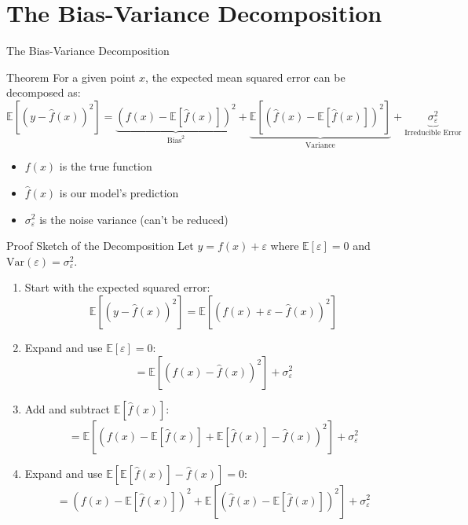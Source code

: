 \documentclass{beamer}
\begin{document}
\section{The Bias-Variance Decomposition}

\begin{frame}{The Bias-Variance Decomposition}
  \begin{block}{Theorem}
    For a given point $x$, the expected mean squared error can be decomposed as:
    \[
    \mathbb{E}[(y - \hat{f}(x))^2] = \underbrace{(f(x) - \mathbb{E}[\hat{f}(x)])^2}_{\text{Bias}^2} + \underbrace{\mathbb{E}[(\hat{f}(x) - \mathbb{E}[\hat{f}(x)])^2]}_{\text{Variance}} + \underbrace{\sigma^2_\varepsilon}_{\text{Irreducible Error}}
    \]
  \end{block}

  \begin{itemize}
    \item $f(x)$ is the true function
    \item $\hat{f}(x)$ is our model's prediction
    \item $\sigma^2_\varepsilon$ is the noise variance (can't be reduced)
  \end{itemize}
\end{frame}

\begin{frame}{Proof Sketch of the Decomposition}
  Let $y = f(x) + \varepsilon$ where $\mathbb{E}[\varepsilon] = 0$ and $\text{Var}(\varepsilon) = \sigma^2_\varepsilon$.
  
  \begin{enumerate}
    \item Start with the expected squared error:
    \[
    \mathbb{E}[(y - \hat{f}(x))^2] = \mathbb{E}[(f(x) + \varepsilon - \hat{f}(x))^2]
    \]
    
    \item Expand and use $\mathbb{E}[\varepsilon] = 0$:
    \[
    = \mathbb{E}[(f(x) - \hat{f}(x))^2] + \sigma^2_\varepsilon
    \]
    
    \item Add and subtract $\mathbb{E}[\hat{f}(x)]$:
    \[
    = \mathbb{E}[(f(x) - \mathbb{E}[\hat{f}(x)] + \mathbb{E}[\hat{f}(x)] - \hat{f}(x))^2] + \sigma^2_\varepsilon
    \]
    
    \item Expand and use $\mathbb{E}[\mathbb{E}[\hat{f}(x)] - \hat{f}(x)] = 0$:
    \[
    = (f(x) - \mathbb{E}[\hat{f}(x)])^2 + \mathbb{E}[(\hat{f}(x) - \mathbb{E}[\hat{f}(x)])^2] + \sigma^2_\varepsilon
    \]
  \end{enumerate}
\end{frame}
\end{document}
